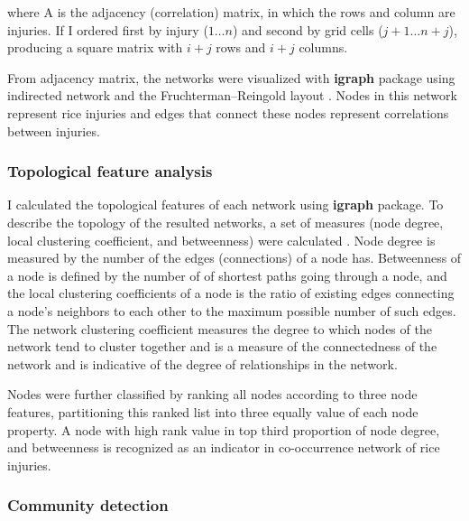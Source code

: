 where A is the adjacency (correlation) matrix, in which the rows and column are injuries. If I ordered first by injury ($1\dots n$) and second by grid cells ($j + 1\dots n + j$), producing a square matrix with $i + j$ rows and $i + j$ columns.

From adjacency matrix, the networks were visualized with \textbf{igraph} package \citep{Csardi_2010_igraph} using indirected network and the Fruchterman–Reingold layout \citep{Fruchterman_1991_Graph}. Nodes in this network represent rice injuries and edges that connect these nodes represent correlations between injuries. 

\subsubsection{Topological feature analysis}

I calculated the topological features of each network using \textbf{igraph} package. To describe the topology of the resulted networks, a set of measures (node degree, local clustering coefficient, and betweenness) were calculated \citep{Newman_2006_Modularity}. Node degree is measured by the number of the edges (connections) of a node has. Betweenness of a node is defined by the number of of shortest paths going through a node, and the local clustering coefficients of a node is the ratio of existing edges connecting a node's neighbors to each other to the maximum possible number of such edges. The network clustering coefficient measures the degree to which nodes of the network tend to cluster together and is a measure of the connectedness of the network and is indicative of the degree of relationships in the network. 

Nodes were further classified by ranking all nodes according to three node features, partitioning this ranked list into three equally value of each node property. A node with high rank value in top third proportion of node degree, and betweenness is recognized as an indicator in co-occurrence network of rice injuries. 

\subsubsection{Community detection}

